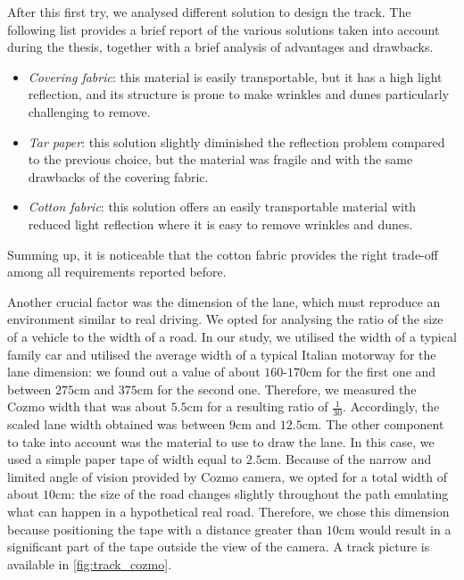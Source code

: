 After this first try, we analysed different solution to design the track.
The following list provides a brief report of the various solutions taken into account during the thesis, together with a brief analysis of advantages and drawbacks.

\begin{itemize}
    \item \textit{Covering fabric}: this material is easily transportable, but it has a high light reflection, and its structure is prone to make wrinkles and dunes particularly challenging to remove.
    \item \textit{Tar paper}: this solution slightly diminished the reflection problem compared to the previous choice, but the material was fragile and with the same drawbacks of the covering fabric.
    \item \textit{Cotton fabric}: this solution offers an easily transportable material with reduced light reflection where it is easy to remove wrinkles and dunes.
\end{itemize}

Summing up, it is noticeable that the cotton fabric provides the right trade-off among all requirements reported before.

Another crucial factor was the dimension of the lane, which must reproduce an environment similar to real driving.
We opted for analysing the ratio of the size of a vehicle to the width of a road.
In our study, we utilised the width of a typical family car and utilised the average width of a typical Italian motorway for the lane dimension: we found out a value of about $160$-$170$cm for the first one and between $275$cm and $375$cm for the second one.
Therefore, we measured the Cozmo width that was about $5.5$cm for a resulting ratio of $\frac{1}{30}$.
Accordingly, the scaled lane width obtained was between $9$cm and $12.5$cm.
The other component to take into account was the material to use to draw the lane.
In this case, we used a simple paper tape of width equal to $2.5$cm.
Because of the narrow and limited angle of vision provided by Cozmo camera, we opted for a total width of about $10$cm: the size of the road changes slightly throughout the path emulating what can happen in a hypothetical real road.
Therefore, we chose this dimension because positioning the tape with a distance greater than $10$cm would result in a significant part of the tape outside the view of the camera.
A track picture is available in \vref{fig:track_cozmo}.